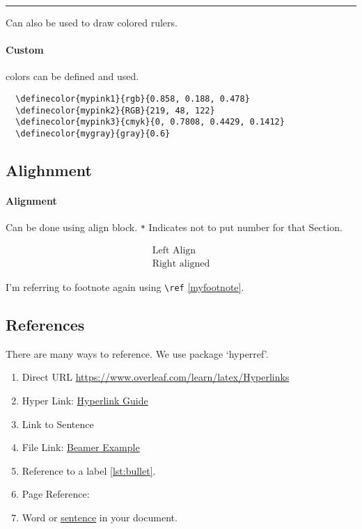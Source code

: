 \documentclass{report}[a4paper,12pt] %
\begin{document}
{\color{RubineRed} \rule{\linewidth}{0.5mm}}
Can also be used to draw colored rulers. 

\paragraph{Custom} colors can be defined and \textcolor{mypink2}{used}.

\begin{verbatim}
  \definecolor{mypink1}{rgb}{0.858, 0.188, 0.478}
  \definecolor{mypink2}{RGB}{219, 48, 122}
  \definecolor{mypink3}{cmyk}{0, 0.7808, 0.4429, 0.1412}
  \definecolor{mygray}{gray}{0.6}
\end{verbatim}

\subsection{Alighnment}
\paragraph{Alignment} Can be done using align block. 
\verb|*| Indicates not to put number for that Section.

\begin{align*}
  \text{Left Align}\\
  \text{Right aligned}
\end{align*}

I'm referring to footnote again using \verb|\ref| \ref{myfootnote}.

\subsection{References}
There are many ways to reference. We use package `hyperref'.
\begin{enumerate}
  \item Direct URL \url{https://www.overleaf.com/learn/latex/Hyperlinks}
  \item Hyper Link: \href{https://www.overleaf.com/learn/latex/Hyperlinks}{Hyperlink Guide}
  \item Link to Sentence
  \item File Link: \href{run:../../presentation/beamer/tutorial.tex}{Beamer Example}
  \item Reference to a label \ref{lst:bullet}.
  \item Page Reference: \pageref{fig:coffee}
  \item Word or \hyperlink{sen:formatopts}{sentence} in your document.
\end{enumerate}
\end{document}

